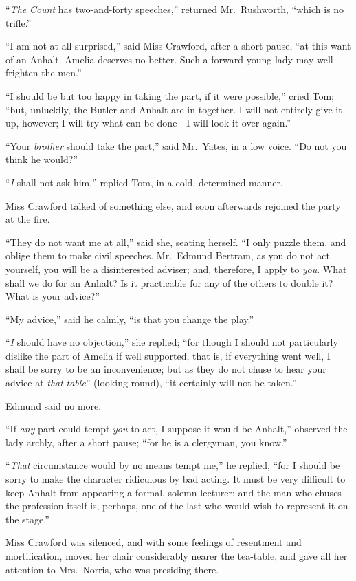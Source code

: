 ``\emph{The} \emph{Count} has two-and-forty speeches,''
returned Mr.\ Rushworth, ``which is no trifle.''

``I am not at all surprised,'' said Miss Crawford,
after a short pause, ``at this want of an Anhalt.
Amelia deserves no better.  Such a forward young lady
may well frighten the men.''

``I should be but too happy in taking the part, if it
were possible,'' cried Tom; ``but, unluckily, the Butler
and Anhalt are in together.  I will not entirely give
it up, however; I will try what can be done---I will look
it over again.''

``Your \emph{brother} should take the part,'' said Mr.\ Yates,
in a low voice.  ``Do not you think he would?''

``\emph{I} shall not ask him,'' replied Tom, in a cold,
determined manner.

Miss Crawford talked of something else, and soon afterwards
rejoined the party at the fire.

``They do not want me at all,'' said she, seating herself.
``I only puzzle them, and oblige them to make civil speeches.
Mr.\ Edmund Bertram, as you do not act yourself,
you will be a disinterested adviser; and, therefore,
I apply to \emph{you}.  What shall we do for an Anhalt?
Is it practicable for any of the others to double it?
What is your advice?''

``My advice,'' said he calmly, ``is that you change the play.''

``\emph{I} should have no objection,'' she replied; ``for though
I should not particularly dislike the part of Amelia
if well supported, that is, if everything went well,
I shall be sorry to be an inconvenience; but as they
do not chuse to hear your advice at \emph{that} \emph{table}''
(looking round), ``it certainly will not be taken.''

Edmund said no more.

``If \emph{any} part could tempt \emph{you} to act, I suppose it would
be Anhalt,'' observed the lady archly, after a short pause;
``for he is a clergyman, you know.''

``\emph{That} circumstance would by no means tempt me,''
he replied, ``for I should be sorry to make the character
ridiculous by bad acting.  It must be very difficult
to keep Anhalt from appearing a formal, solemn lecturer;
and the man who chuses the profession itself is, perhaps,
one of the last who would wish to represent it on the stage.''

Miss Crawford was silenced, and with some feelings of resentment
and mortification, moved her chair considerably nearer the
tea-table, and gave all her attention to Mrs.\ Norris, who was
presiding there.

